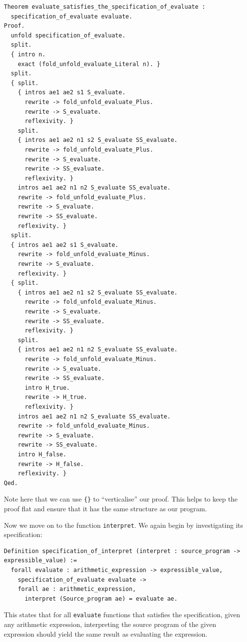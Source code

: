\documentclass{article}
\begin{document}
\begin{lstlisting}
Theorem evaluate_satisfies_the_specification_of_evaluate :
  specification_of_evaluate evaluate.
Proof.
  unfold specification_of_evaluate.
  split.
  { intro n.
    exact (fold_unfold_evaluate_Literal n). }
  split.
  { split.
    { intros ae1 ae2 s1 S_evaluate.
      rewrite -> fold_unfold_evaluate_Plus.
      rewrite -> S_evaluate.
      reflexivity. }
    split.
    { intros ae1 ae2 n1 s2 S_evaluate SS_evaluate.
      rewrite -> fold_unfold_evaluate_Plus.
      rewrite -> S_evaluate.
      rewrite -> SS_evaluate.
      reflexivity. }
    intros ae1 ae2 n1 n2 S_evaluate SS_evaluate.
    rewrite -> fold_unfold_evaluate_Plus.
    rewrite -> S_evaluate.
    rewrite -> SS_evaluate.
    reflexivity. }
  split.
  { intros ae1 ae2 s1 S_evaluate.
    rewrite -> fold_unfold_evaluate_Minus.
    rewrite -> S_evaluate.
    reflexivity. }
  { split.
    { intros ae1 ae2 n1 s2 S_evaluate SS_evaluate.
      rewrite -> fold_unfold_evaluate_Minus.
      rewrite -> S_evaluate.
      rewrite -> SS_evaluate.
      reflexivity. }
    split.
    { intros ae1 ae2 n1 n2 S_evaluate SS_evaluate.
      rewrite -> fold_unfold_evaluate_Minus.
      rewrite -> S_evaluate.
      rewrite -> SS_evaluate.
      intro H_true.
      rewrite -> H_true.
      reflexivity. }
    intros ae1 ae2 n1 n2 S_evaluate SS_evaluate.
    rewrite -> fold_unfold_evaluate_Minus.
    rewrite -> S_evaluate.
    rewrite -> SS_evaluate.
    intro H_false.
    rewrite -> H_false.
    reflexivity. }
Qed.
\end{lstlisting}

Note here that we can use \texttt{\{\}} to ``verticalise'' our proof. This helps to keep the proof flat and ensure that it has the same structure as our program. 

Now we move on to the function \texttt{interpret}. We again begin by investigating its specification:

\begin{lstlisting}
Definition specification_of_interpret (interpret : source_program -> expressible_value) :=
  forall evaluate : arithmetic_expression -> expressible_value,
    specification_of_evaluate evaluate ->
    forall ae : arithmetic_expression,
      interpret (Source_program ae) = evaluate ae.
\end{lstlisting}

This states that for all \texttt{evaluate} functions that satisfies the specification, given any arithmetic expression, interpreting the source program of the given expression should yield the same result as evaluating the expression.
\end{document}
